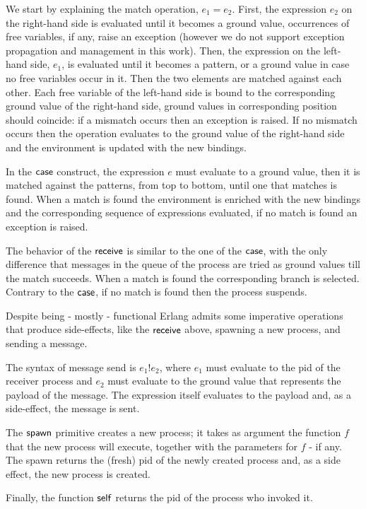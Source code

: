 \documentclass{article}[12pt,a4paper]
\theoremstyle{definition}
\begin{document}
We start by explaining the match operation, $e_1 = e_2$. First, the expression $e_2$ on
the right-hand side is evaluated until it becomes a ground value,
occurrences of free variables, if any, raise an exception (however we do not support exception propagation and management in this work).
Then, the expression on the left-hand side, $e_1$, is evaluated until
it becomes a pattern, or a ground value in case no free variables
occur in it. Then the
two elements are matched against each other. Each free variable of the
left-hand side is bound to the corresponding ground value of the right-hand
side, ground values in corresponding position should coincide: if a mismatch occurs then an exception
is raised. If no mismatch occurs then the operation evaluates to the ground
value of the right-hand side and the environment is updated with the new bindings.

In the $\mathsf{case}$ construct, the expression $e$ must evaluate to a ground value, then it is matched against the patterns, from
top to bottom, until one that matches is found. When a match is found the environment
is enriched with the new bindings and the corresponding sequence of expressions evaluated, if
no match is found an exception is raised.

The behavior of the $\mathsf{receive}$ is similar to the one of the
$\mathsf{case}$, with the only difference that messages in the queue of
the process are tried as ground values till the match succeeds.
When a match is found the corresponding branch
is selected.  Contrary to the $\mathsf{case}$, if no match is found
then the process suspends.

Despite being - mostly - functional Erlang
admits some imperative operations that produce side-effects, like the $\mathsf{receive}$
above, spawning a new process, and sending a message. 

The syntax of message send is $e_1!e_2$, where $e_1$ must
evaluate to the pid of the receiver process and $e_2$ must evaluate to the ground value that represents the payload of the message. The expression itself evaluates to
the payload and, as a side-effect, the message is sent.

The $\mathsf{spawn}$ primitive creates a new process; it takes as argument
the function $f$ that the new process will execute, together with the
parameters for $f$ - if any. The spawn returns the
(fresh) pid of the newly created process and, as a side effect, the new process is created.

Finally, the function $\mathsf{self}$ returns the pid of the process
who invoked it.
\end{document}
